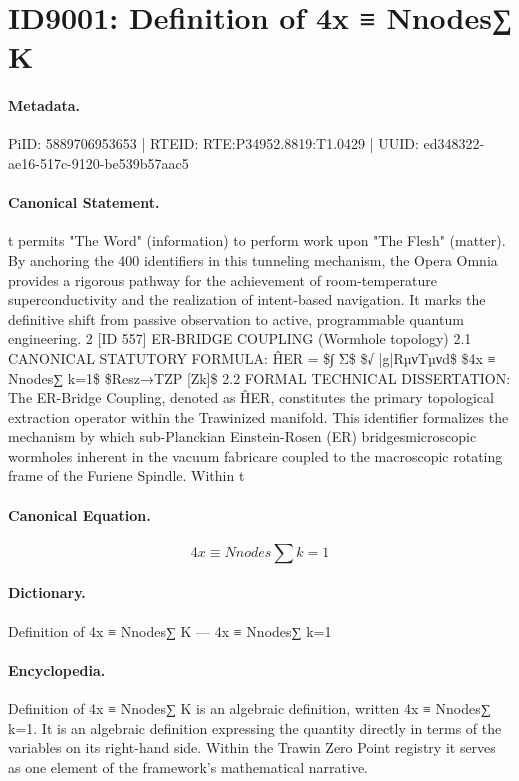 \section*{ID9001: Definition of 4x ≡ Nnodes∑ K}
\paragraph{Metadata.}
PiID: 5889706953653 | RTEID: RTE:P34952.8819:T1.0429 | UUID: ed348322-ae16-517c-9120-be539b57aac5

\paragraph{Canonical Statement.}
t permits "The Word" (information) to perform work upon "The Flesh" (matter). By anchoring the 400 identifiers in this tunneling mechanism, the Opera Omnia provides a rigorous pathway for the achievement of room-temperature superconductivity and the realization of intent-based navigation. It marks the definitive shift from passive observation to active, programmable quantum engineering. 2 [ID 557] ER-BRIDGE COUPLING (Wormhole topology) 2.1 CANONICAL STATUTORY FORMULA: ĤER = \$∫ Σ\$ \$√ |g|RµνTµνd\$ \$4x ≡ Nnodes∑ k=1\$ \$Resz→TZP [Zk]\$ 2.2 FORMAL TECHNICAL DISSERTATION: The ER-Bridge Coupling, denoted as ĤER, constitutes the primary topological extraction operator within the Trawinized manifold. This identifier formalizes the mechanism by which sub-Planckian Einstein-Rosen (ER) bridgesmicroscopic wormholes inherent in the vacuum fabricare coupled to the macroscopic rotating frame of the Furiene Spindle. Within t

\paragraph{Canonical Equation.}
\[
4x ≡ Nnodes∑ k=1
\]

\paragraph{Dictionary.}
Definition of 4x ≡ Nnodes∑ K — 4x ≡ Nnodes∑ k=1

\paragraph{Encyclopedia.}
Definition of 4x ≡ Nnodes∑ K is an algebraic definition, written 4x ≡ Nnodes∑ k=1. It is an algebraic definition expressing the quantity directly in terms of the variables on its right-hand side. Within the Trawin Zero Point registry it serves as one element of the framework's mathematical narrative.
